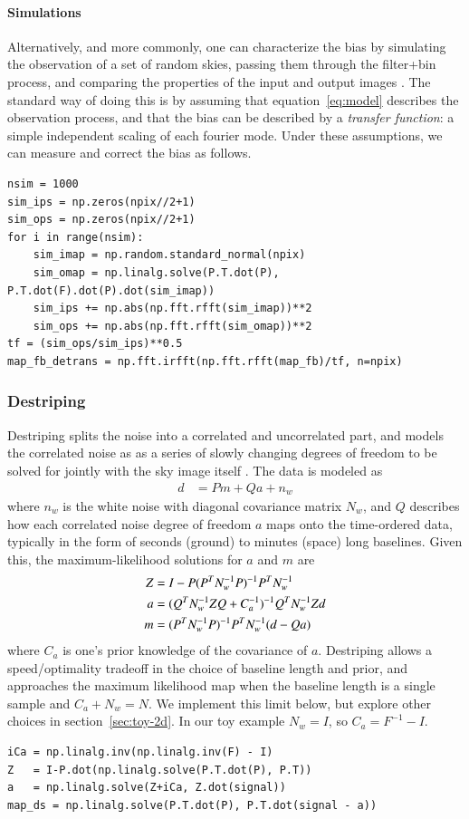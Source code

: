 \documentclass{aa}
\begin{document}
\paragraph{Simulations}
Alternatively, and more commonly, one can characterize the bias
by simulating the observation of a set of random skies, passing
them through the filter+bin process, and comparing the properties
of the input and output images \citep[e.g.][]{spt-bmodes-2020}. The standard way of doing this is
by assuming that equation~\ref{eq:model} describes the observation
process, and that the bias can be described by a \emph{transfer function}:
a simple independent scaling of each fourier mode. Under
these assumptions, we can measure and correct the bias as follows.
\begin{lstlisting}
nsim = 1000
sim_ips = np.zeros(npix//2+1)
sim_ops = np.zeros(npix//2+1)
for i in range(nsim):
	sim_imap = np.random.standard_normal(npix)
	sim_omap = np.linalg.solve(P.T.dot(P), P.T.dot(F).dot(P).dot(sim_imap))
	sim_ips += np.abs(np.fft.rfft(sim_imap))**2
	sim_ops += np.abs(np.fft.rfft(sim_omap))**2
tf = (sim_ops/sim_ips)**0.5
map_fb_detrans = np.fft.irfft(np.fft.rfft(map_fb)/tf, n=npix)
\end{lstlisting}

\subsubsection{Destriping}
Destriping splits the noise into a correlated and uncorrelated part,
and models the correlated noise as as a series of slowly changing
degrees of freedom to be solved for jointly with the sky image itself
\citep{descart-destriper,planck-destriping}.
The data is modeled as
\begin{align}
	d &= Pm + Qa + n_w
\end{align}
where $n_w$ is the white noise with diagonal covariance matrix $N_w$,
and $Q$ describes how each correlated noise degree of freedom $a$
maps onto the time-ordered data, typically in the form of seconds
(ground) to minutes (space) long baselines. Given this, the
maximum-likelihood solutions for $a$ and $m$ are
\begin{align}
	Z &= I - P(P^TN_w^{-1}P)^{-1}P^TN_w^{-1} \notag \\
	a &= (Q^TN_w^{-1}ZQ + C_a^{-1})^{-1} Q^TN_w^{-1}Zd \notag \\
	m &= (P^TN_w^{-1}P)^{-1}P^TN_w^{-1}(d - Qa) \label{eq:destripe}
\end{align}
where $C_a$ is one's prior knowledge of the covariance of $a$.
Destriping allows a speed/optimality tradeoff in the choice of
baseline length and prior, and approaches the maximum likelihood
map when the baseline length is a single sample and $C_a + N_w = N$.
We implement this limit below, but explore other choices in section~\ref{sec:toy-2d}.
In our toy example $N_w = I$, so $C_a = F^{-1}-I$.
\begin{lstlisting}
iCa = np.linalg.inv(np.linalg.inv(F) - I)
Z   = I-P.dot(np.linalg.solve(P.T.dot(P), P.T))
a   = np.linalg.solve(Z+iCa, Z.dot(signal))
map_ds = np.linalg.solve(P.T.dot(P), P.T.dot(signal - a))
\end{lstlisting}
\end{document}
